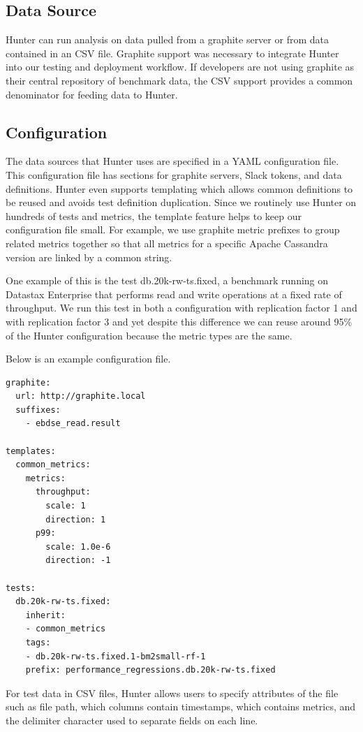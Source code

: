 \documentclass[sigconf]{acmart}
\begin{document}
\subsection{Data Source}
Hunter can run analysis on data pulled from a graphite server or from data contained in an CSV file. Graphite support was necessary to integrate Hunter into our testing and deployment workflow. If developers are not using graphite as their central repository of benchmark data, the CSV support provides a common denominator for feeding data to Hunter.

\subsection{Configuration}
The data sources that Hunter uses are specified in a YAML configuration file. This configuration file has sections for graphite servers, Slack tokens, and data definitions. Hunter even supports templating which allows common definitions to be reused and avoids test definition duplication. Since we routinely use Hunter on hundreds of tests and metrics, the template feature helps to keep our configuration file small. For example, we use graphite metric prefixes to group related metrics together so that all metrics for a specific Apache Cassandra version are linked by a common string.

One example of this is the test db.20k-rw-ts.fixed, a benchmark running on Datastax Enterprise
that performs read and write operations at a fixed rate of throughput. We run this test in both
a configuration with replication factor 1 and with replication factor 3 and yet despite this
difference we can reuse around 95\% of the Hunter configuration because the metric types are the same.

Below is an example configuration file.

\begin{verbatim}
graphite:
  url: http://graphite.local
  suffixes:
    - ebdse_read.result

templates:
  common_metrics:
    metrics:
      throughput:
        scale: 1
        direction: 1
      p99:
        scale: 1.0e-6
        direction: -1

tests:
  db.20k-rw-ts.fixed:
    inherit:
    - common_metrics
    tags:
    - db.20k-rw-ts.fixed.1-bm2small-rf-1
    prefix: performance_regressions.db.20k-rw-ts.fixed

\end{verbatim}

For test data in CSV files, Hunter allows users to specify attributes of the file such as file path, which columns contain timestamps, which contains metrics, and the delimiter character used to separate fields on each line.
\end{document}
